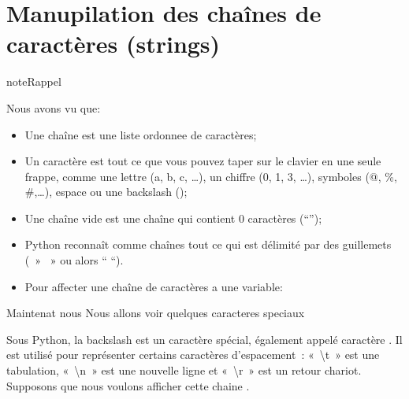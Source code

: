 \documentclass[letterpaper,10pt,french]{sphinxmanual}
\begin{document}
\section{Manupilation des chaînes de caractères (strings)}
\label{\detokenize{ch3:manupilation-des-chaines-de-caracteres-strings}}\label{\detokenize{ch3::doc}}
\begin{sphinxadmonition}{note}{Rappel}

\sphinxAtStartPar
Nous avons vu que:
\begin{itemize}
\item {} 
\sphinxAtStartPar
Une chaîne est une liste ordonnee de caractères;

\item {} 
\sphinxAtStartPar
Un caractère est tout ce que vous pouvez taper sur le clavier en une seule frappe,
comme une lettre (a, b, c, …), un chiffre (0, 1, 3, …), symboles (@, \%, \#,…), espace ou une backslash ();

\item {} 
\sphinxAtStartPar
Une chaîne vide est une chaîne qui contient 0 caractères (“”);

\item {} 
\sphinxAtStartPar
Python reconnaît comme chaînes tout ce qui est délimité par des guillemets
( »  » ou alors “ “).

\item {} 
\sphinxAtStartPar
Pour affecter une chaîne de caractères a une variable:

\end{itemize}

\begin{sphinxVerbatim}[commandchars=\\\{\}]
  
\end{sphinxVerbatim}
\end{sphinxadmonition}

\sphinxAtStartPar
Maintenat nous Nous allons voir quelques caracteres speciaux

\sphinxAtStartPar
Sous Python, la backslash  est un caractère spécial, également appelé caractère . Il est utilisé pour représenter certains caractères d’espacement : « \textbackslash{}t » est une tabulation, « \textbackslash{}n » est une nouvelle ligne et « \textbackslash{}r » est un retour chariot. Supposons que nous voulons afficher cette chaine .
\end{document}
